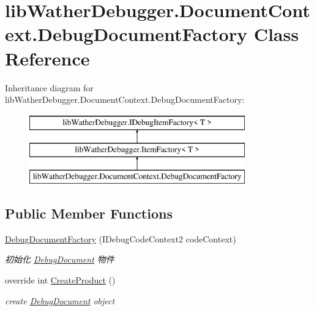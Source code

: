 \hypertarget{classlib_wather_debugger_1_1_document_context_1_1_debug_document_factory}{\section{lib\+Wather\+Debugger.\+Document\+Context.\+Debug\+Document\+Factory Class Reference}
\label{classlib_wather_debugger_1_1_document_context_1_1_debug_document_factory}
}
Inheritance diagram for lib\+Wather\+Debugger.\+Document\+Context.\+Debug\+Document\+Factory\+:\begin{figure}[H]
\begin{center}
\leavevmode
\includegraphics[height=3.000000cm]{classlib_wather_debugger_1_1_document_context_1_1_debug_document_factory}
\end{center}
\end{figure}
\subsection*{Public Member Functions}
\begin{DoxyCompactItemize}
\item 
\hyperlink{classlib_wather_debugger_1_1_document_context_1_1_debug_document_factory_a7ff7ed950ce3f77ec38e08b15a29b4a7}{Debug\+Document\+Factory} (I\+Debug\+Code\+Context2 code\+Context)
\begin{DoxyCompactList}\small\item\em 初始化 \hyperlink{classlib_wather_debugger_1_1_document_context_1_1_debug_document}{Debug\+Document} 物件 \end{DoxyCompactList}\item 
override int \hyperlink{classlib_wather_debugger_1_1_document_context_1_1_debug_document_factory_ae7b77a9e81fdc9f9b6b8c7378436f657}{Create\+Product} ()
\begin{DoxyCompactList}\small\item\em create \hyperlink{classlib_wather_debugger_1_1_document_context_1_1_debug_document}{Debug\+Document} object \end{DoxyCompactList}\end{DoxyCompactItemize}
